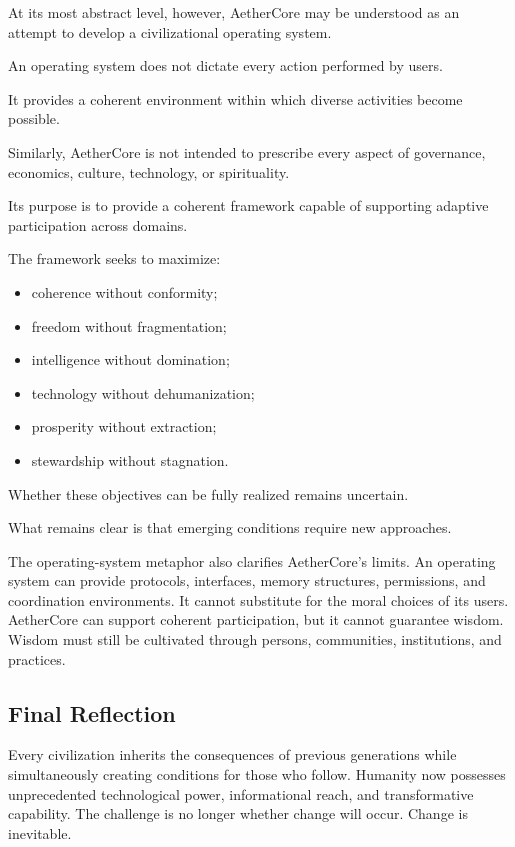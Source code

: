 \documentclass[12pt]{article}
\begin{document}
At its most abstract level, however, AetherCore may be understood as an attempt to develop a civilizational operating system.

An operating system does not dictate every action performed by users.

It provides a coherent environment within which diverse activities become possible.

Similarly, AetherCore is not intended to prescribe every aspect of governance, economics, culture, technology, or spirituality.

Its purpose is to provide a coherent framework capable of supporting adaptive participation across domains.

The framework seeks to maximize:

\begin{itemize}
  \item coherence without conformity;
  \item freedom without fragmentation;
  \item intelligence without domination;
  \item technology without dehumanization;
  \item prosperity without extraction;
  \item stewardship without stagnation.
\end{itemize}

Whether these objectives can be fully realized remains uncertain.

What remains clear is that emerging conditions require new approaches.

The operating-system metaphor also clarifies AetherCore's limits. An operating system can provide protocols, interfaces, memory structures, permissions, and coordination environments. It cannot substitute for the moral choices of its users. AetherCore can support coherent participation, but it cannot guarantee wisdom. Wisdom must still be cultivated through persons, communities, institutions, and practices.

\subsection{Final Reflection}

Every civilization inherits the consequences of previous generations while simultaneously creating conditions for those who follow. Humanity now possesses unprecedented technological power, informational reach, and transformative capability. The challenge is no longer whether change will occur. Change is inevitable.
\end{document}
